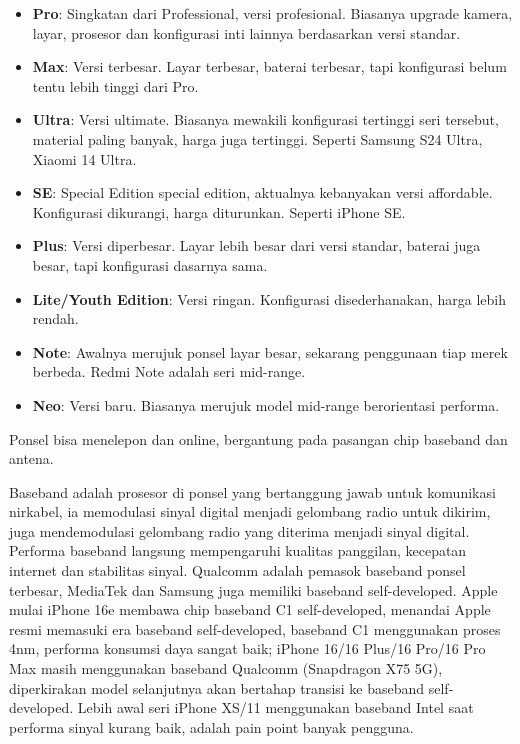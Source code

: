 
\begin{itemize}
  \item \textbf{Pro}: Singkatan dari Professional, versi profesional. Biasanya upgrade kamera, layar, prosesor dan konfigurasi inti lainnya berdasarkan versi standar.
  \item \textbf{Max}: Versi terbesar. Layar terbesar, baterai terbesar, tapi konfigurasi belum tentu lebih tinggi dari Pro.
  \item \textbf{Ultra}: Versi ultimate. Biasanya mewakili konfigurasi tertinggi seri tersebut, material paling banyak, harga juga tertinggi. Seperti Samsung S24 Ultra, Xiaomi 14 Ultra.
  \item \textbf{SE}: Special Edition special edition, aktualnya kebanyakan versi affordable. Konfigurasi dikurangi, harga diturunkan. Seperti iPhone SE.
  \item \textbf{Plus}: Versi diperbesar. Layar lebih besar dari versi standar, baterai juga besar, tapi konfigurasi dasarnya sama.
  \item \textbf{Lite/Youth Edition}: Versi ringan. Konfigurasi disederhanakan, harga lebih rendah.
  \item \textbf{Note}: Awalnya merujuk ponsel layar besar, sekarang penggunaan tiap merek berbeda. Redmi Note adalah seri mid-range.
  \item \textbf{Neo}: Versi baru. Biasanya merujuk model mid-range berorientasi performa.
\end{itemize}


Ponsel bisa menelepon dan online, bergantung pada pasangan chip baseband dan antena.


Baseband adalah prosesor di ponsel yang bertanggung jawab untuk komunikasi nirkabel, ia memodulasi sinyal digital menjadi gelombang radio untuk dikirim, juga mendemodulasi gelombang radio yang diterima menjadi sinyal digital. Performa baseband langsung mempengaruhi kualitas panggilan, kecepatan internet dan stabilitas sinyal. Qualcomm adalah pemasok baseband ponsel terbesar, MediaTek dan Samsung juga memiliki baseband self-developed. Apple mulai iPhone 16e membawa chip baseband C1 self-developed, menandai Apple resmi memasuki era baseband self-developed, baseband C1 menggunakan proses 4nm, performa konsumsi daya sangat baik; iPhone 16/16 Plus/16 Pro/16 Pro Max masih menggunakan baseband Qualcomm (Snapdragon X75 5G), diperkirakan model selanjutnya akan bertahap transisi ke baseband self-developed. Lebih awal seri iPhone XS/11 menggunakan baseband Intel saat performa sinyal kurang baik, adalah pain point banyak pengguna.

